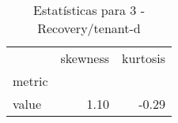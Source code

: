 \begin{table}[htbp]
\caption{Estatísticas para 3 - Recovery/tenant-d}
\label{tab:3_-_recovery_tenant-d_skewkurt}
\begin{tabular}{lrr}
\toprule
 & skewness & kurtosis \\
metric &  &  \\
\midrule
value & 1.10 & -0.29 \\
\bottomrule
\end{tabular}
\end{table}
